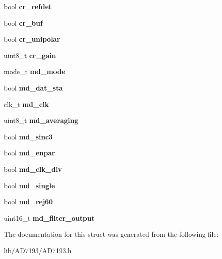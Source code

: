 \begin{DoxyCompactItemize}
bool {\bfseries cr\+\_\+refdet}
\item 
\mbox{\label{structAD7193_1_1config__t_a0cd666117c43f4de9839ade9b61390dd}} 
bool {\bfseries cr\+\_\+buf}
\item 
\mbox{\label{structAD7193_1_1config__t_ae7095743f39f63fd5d43e5edd0caed7c}} 
bool {\bfseries cr\+\_\+unipolar}
\item 
\mbox{\label{structAD7193_1_1config__t_a491f01245ca47066c67988f99bfe6b7b}} 
uint8\+\_\+t {\bfseries cr\+\_\+gain}
\item 
\mbox{\label{structAD7193_1_1config__t_af8e21cda61a2cfa2884edde24bd0c57f}} 
mode\+\_\+t {\bfseries md\+\_\+mode}
\item 
\mbox{\label{structAD7193_1_1config__t_ad68b16605555250d752aae8dfd0a547a}} 
bool {\bfseries md\+\_\+dat\+\_\+sta}
\item 
\mbox{\label{structAD7193_1_1config__t_a643a63d5db3a0245a309eb0babf92ea4}} 
clk\+\_\+t {\bfseries md\+\_\+clk}
\item 
\mbox{\label{structAD7193_1_1config__t_adc171af21db7979f3cec6b78085a0bb5}} 
uint8\+\_\+t {\bfseries md\+\_\+averaging}
\item 
\mbox{\label{structAD7193_1_1config__t_aafb3235619235b7fd3fd2891d66a466d}} 
bool {\bfseries md\+\_\+sinc3}
\item 
\mbox{\label{structAD7193_1_1config__t_adb16b9476bdbea6352d2e921d43f57c0}} 
bool {\bfseries md\+\_\+enpar}
\item 
\mbox{\label{structAD7193_1_1config__t_a1dfe2f378940a7e7cfb12711dcec3b0f}} 
bool {\bfseries md\+\_\+clk\+\_\+div}
\item 
\mbox{\label{structAD7193_1_1config__t_a9d87cbc553bea8ef7b0c43b543d3ca1a}} 
bool {\bfseries md\+\_\+single}
\item 
\mbox{\label{structAD7193_1_1config__t_a5d182b1aa368e7916a6c362207375fb7}} 
bool {\bfseries md\+\_\+rej60}
\item 
\mbox{\label{structAD7193_1_1config__t_a33b2f21203ce134a971b183db9ec4b23}} 
uint16\+\_\+t {\bfseries md\+\_\+filter\+\_\+output}
\end{DoxyCompactItemize}


The documentation for this struct was generated from the following file\+:\begin{DoxyCompactItemize}
\item 
lib/\+A\+D7193/A\+D7193.\+h\end{DoxyCompactItemize}

